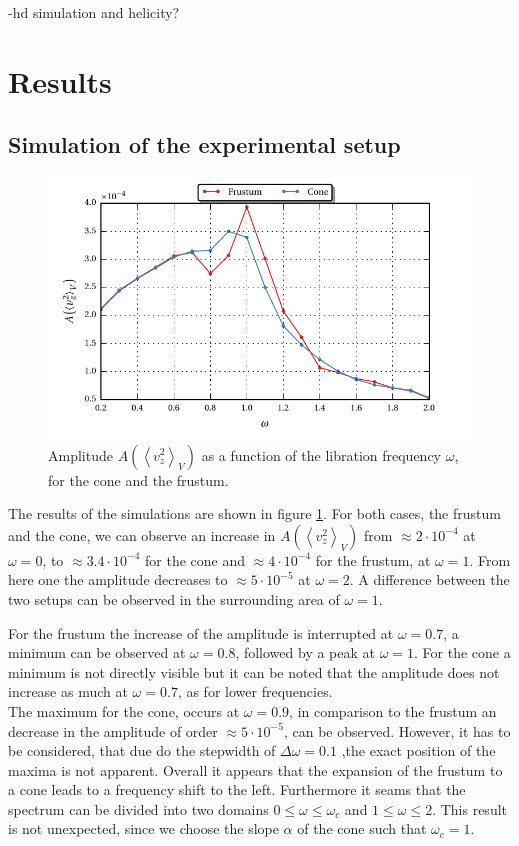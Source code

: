 -hd simulation and helicity?

\clearpage

\section{Results}
\subsection{Simulation of the experimental setup}
\label{cone:exp}

\begin{figure}[!bp]
  \centering
  \includegraphics{gfx/cone/experiment/experiment.pdf}
  \caption{Amplitude $A\left(\left<v^2_z\right>_V\right)$ as a function of the libration frequency $\omega$,
            for the cone and the frustum.  \label{fig:cone_expseries} }
\end{figure}

The results of the simulations are shown in figure \ref{fig:cone_expseries}.
For both cases, the frustum and the cone, we can observe an increase in $A\left(\left<v^2_z\right>_V\right)$
from $\approx 2\cdot10^{-4}$ at $\omega=0$, to  $\approx 3.4\cdot10^{-4}$ for the cone and $\approx 4\cdot10^{-4}$ for the frustum,  at $\omega=1$.
From here one the amplitude decreases to $\approx 5\cdot10^{-5}$ at $\omega=2$.
A difference between the two setups can be observed in the surrounding area of $\omega=1$.

For the frustum the increase of the amplitude is interrupted at $\omega=0.7$, a minimum can be observed at $\omega=0.8$, followed by
a peak at $\omega=1$. For the cone a minimum is not directly visible but it can be noted that the
amplitude does not increase as much at $\omega=0.7$, as for lower frequencies.\\
The maximum for the cone, occurs at $\omega=0.9$, in comparison to the frustum an decrease in the amplitude of order $\approx 5\cdot10^{-5}$, can be observed.
However, it has to be considered, that due do the stepwidth of $\Delta\omega = 0.1$ ,the exact position of the maxima is not apparent.
Overall it appears that the expansion of the frustum to a cone leads to a frequency shift to the left.
Furthermore it seams that the spectrum can be divided into two domains $0\leq\omega\leq\omega_c$ and $1 \leq \omega\leq 2$.
This result is not unexpected, since we choose the slope $\alpha$ of the cone such that $\omega_c=1$.

